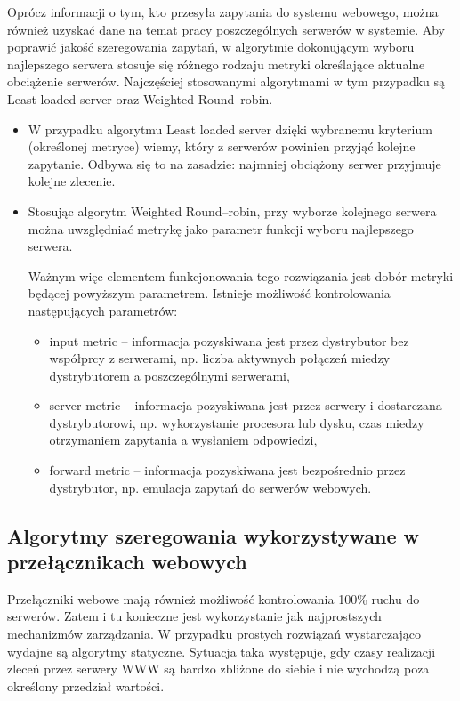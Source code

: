 Oprócz informacji o tym, kto przesyła zapytania do systemu webowego, można również uzyskać dane na temat pracy poszczególnych 
serwerów w systemie. Aby poprawić jakość szeregowania zapytań, w algorytmie dokonującym wyboru najlepszego serwera stosuje się 
różnego rodzaju metryki określające aktualne obciążenie serwerów. Najczęściej stosowanymi algorytmami w tym przypadku są Least 
loaded server oraz Weighted Round--robin. 
\begin{itemize}
\item W przypadku algorytmu Least loaded server dzięki wybranemu kryterium (określonej metryce) wiemy, który z serwerów 
powinien przyjąć kolejne zapytanie. Odbywa się to na zasadzie: najmniej obciążony serwer przyjmuje kolejne zlecenie. 
\item Stosując algorytm Weighted Round--robin, przy wyborze kolejnego serwera można uwzględniać metrykę jako parametr funkcji 
wyboru najlepszego serwera.

Ważnym więc elementem funkcjonowania tego rozwiązania jest dobór metryki będącej powyższym parametrem. Istnieje 
możliwość kontrolowania następujących parametrów:
\begin{itemize}
\item input metric -- informacja pozyskiwana jest przez dystrybutor bez współprcy z serwerami, np. liczba aktywnych połączeń 
miedzy dystrybutorem a poszczególnymi serwerami,
\item server metric -- informacja pozyskiwana jest przez serwery i dostarczana dystrybutorowi, np. wykorzystanie procesora lub 
dysku, czas miedzy otrzymaniem zapytania a wysłaniem odpowiedzi,
\item forward metric -- informacja pozyskiwana jest bezpośrednio przez dystrybutor, np. emulacja zapytań do serwerów webowych.
\end{itemize}
\end{itemize}

\subsection{Algorytmy szeregowania wykorzystywane w przełącznikach webowych}
Przełączniki webowe mają również możliwość kontrolowania 100\% ruchu do serwerów. Zatem i tu konieczne jest wykorzystanie jak 
najprostszych mechanizmów zarządzania. W przypadku prostych rozwiązań wystarczająco wydajne są algorytmy statyczne. Sytuacja 
taka występuje, gdy czasy realizacji zleceń przez serwery WWW są bardzo zbliżone do siebie i nie wychodzą poza określony 
przedział wartości.

